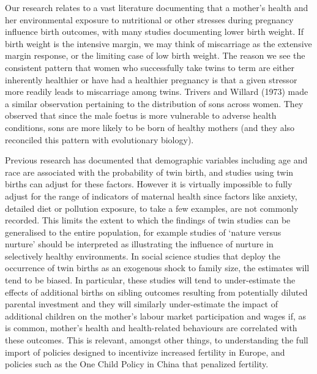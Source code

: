 \documentclass{nature}
\begin{document}
\begin{linenumbers}
Our research relates to a vast literature documenting that a mother's health and her environmental exposure to nutritional or other stresses during pregnancy influence birth outcomes, with many studies documenting lower birth weight\cite{CurrieMoretti2007,Bernsteinetal2005,SerranoDomeque2014}. If birth weight is the intensive margin, we may think of miscarriage as the extensive margin response, or the limiting case of low birth weight. The reason we see the consistent pattern that women who successfully take twins to term are either inherently healthier or have had a healthier pregnancy is that a given stressor more readily leads to miscarriage among twins. Trivers and Willard (1973) made a similar observation pertaining to the distribution of sons across women. They observed that since the male foetus is more vulnerable to adverse health conditions, sons are more likely to be born of healthy mothers (and they also reconciled this pattern with evolutionary biology)\cite{TriversWillard1973}. %

Previous research has documented that demographic variables including age and race are associated with the probability of twin birth, and studies using twin births can adjust for these factors. However it is virtually impossible to fully adjust for the range of indicators of maternal health since factors like anxiety, detailed diet or pollution exposure, to take a few examples, are not commonly recorded. This limits the extent to which the findings of twin studies can be generalised to the entire population, for example studies of `nature versus nurture' should be interpreted as illustrating the influence of nurture in selectively healthy environments. In social science studies that deploy the occurrence of twin births as an exogenous shock to family size, the estimates will tend to be biased. In particular, these studies will tend to under-estimate the effects of additional births on sibling outcomes resulting from potentially diluted parental investment and they will similarly under-estimate the impact of additional children on the mother's labour market participation and wages if, as is common, mother's health and health-related behaviours are correlated with these outcomes. This is relevant, amongst other things, to understanding the full import of policies designed to incentivize increased fertility in Europe, and policies such as the One Child Policy in China that penalized fertility. 



\end{linenumbers}
\end{document}
